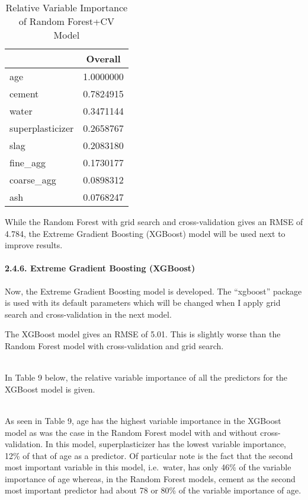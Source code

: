 \documentclass[
]{article}
\begin{document}
\begin{table}[H]

\caption{\label{tab:Variable Importance - RF+CV}Relative Variable Importance of Random Forest+CV Model}
\centering
\fontsize{11}{13}\selectfont
\begin{tabular}[t]{|>{}l|||>{}c|}
\hline
  & Overall\\
\hline
age & 1.0000000\\
\hline
cement & 0.7824915\\
\hline
water & 0.3471144\\
\hline
superplasticizer & 0.2658767\\
\hline
slag & 0.2083180\\
\hline
fine\_agg & 0.1730177\\
\hline
coarse\_agg & 0.0898312\\
\hline
ash & 0.0768247\\
\hline
\end{tabular}
\end{table}

\hfill\break
While the Random Forest with grid search and cross-validation gives an
RMSE of 4.784, the Extreme Gradient Boosting (XGBoost) model will be
used next to improve results.

\hypertarget{extreme-gradient-boosting-xgboost}{%
\paragraph{2.4.6. Extreme Gradient Boosting
(XGBoost)}\label{extreme-gradient-boosting-xgboost}}

\hfill\break
Now, the Extreme Gradient Boosting model is developed. The ``xgboost''
package is used with its default parameters which will be changed when I
apply grid search and cross-validation in the next model.

The XGBoost model gives an RMSE of 5.01. This is slightly worse than the
Random Forest model with cross-validation and grid search.\\
\strut \\
In Table 9 below, the relative variable importance of all the predictors
for the XGBoost model is given.\\
\strut \\
As seen in Table 9, age has the highest variable importance in the
XGBoost model as was the case in the Random Forest model with and
without cross-validation. In this model, superplasticizer has the lowest
variable importance, 12\% of that of age as a predictor. Of particular
note is the fact that the second most important variable in this model,
i.e.~water, has only 46\% of the variable importance of age whereas, in
the Random Forest models, cement as the second most important predictor
had about 78 or 80\% of the variable importance of age.
\end{document}
